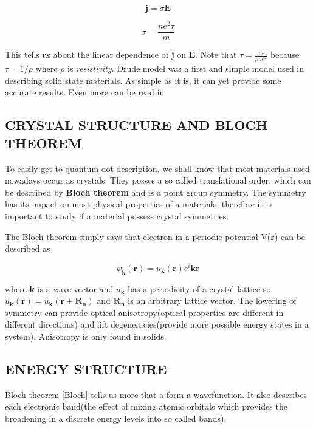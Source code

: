 \begin{equation}
\mathbf{j}=\sigma\mathbf{E}
\end{equation}

\begin{equation}
\sigma=\frac{ne^2\tau}{m}
\end{equation}

This tells us about the linear dependence of \textbf{j} on \textbf{E}. Note that $\tau = \frac{m}{\rho n e^{2}}$ because $\tau = 1/\rho$ where $\rho$ is \textit{resistivity}.
Drude model was a first and simple model used in describing solid state materials. As simple as it is, it can yet provide some accurate results. Even more can be read in \cite{Aschcroft}


\subsection{CRYSTAL STRUCTURE AND BLOCH THEOREM}

To easily get to quantum dot description, we shall know that most materials used nowadays occur as crystals. They posses a so called translational order, which can be described by \textbf{Bloch theorem} and is a point group symmetry. The symmetry has its impact on most physical properties of a materials, therefore it is important to study if a material possess crystal symmetries. 

The Bloch theorem simply says that electron in a periodic potential V(\textbf{r}) can be described as 

\begin{equation}
\psi _\mathbf{k} (\mathbf{r}) = u_\mathbf{k}(\mathbf{r})e^i\mathbf{k}\mathbf{r}
\label{Bloch}
\end{equation}

where \textbf{k} is a wave vector and $u_\mathbf{k}$ has a periodicity of a crystal lattice so $u_\mathbf{k}(\mathbf{r}) = u_\mathbf{k}(\mathbf{r+R_n})$ and $\mathbf{R_n}$ is an arbitrary lattice vector.
The lowering of symmetry can provide optical anisotropy(optical properties are different in different directions) and lift degeneracies(provide more possible energy states in a system). Anisotropy is only found in solids.

\subsection{ENERGY STRUCTURE}
Bloch theorem \ref{Bloch} tells us more that a form a wavefunction. It also describes each electronic band(the effect of mixing atomic orbitals which provides the broadening in a discrete energy levels into so called bands). 

